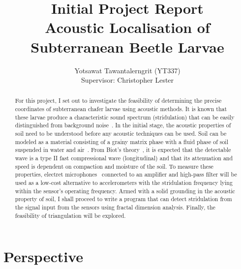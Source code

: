 \documentclass[twocolumn]{article}
\begin{document}

\title{Initial Project Report\\
    Acoustic Localisation of Subterranean Beetle Larvae}
\author{Yotsawat Tawantalerngrit (YT337)\\
    Supervisor: Christopher Lester}
\pagestyle{empty}
\maketitle
\thispagestyle{empty}

\pagestyle{fancy}

\begin{abstract}
    For this project, I set out to investigate the feasibility of determining the precise coordinates of subterranean chafer larvae using acoustic methods. It is known that these larvae produce a characteristic sound spectrum (stridulation) that can be easily distinguished from background noise~\cite{stridDetect}. In the initial stage, the acoustic properties of soil need to be understood before any acoustic techniques can be used. Soil can be modeled as a material consisting of a grainy matrix phase with a fluid phase of soil suspended in water and air~\cite{compactSoil}. From Biot's theory~\cite{biot}, it is expected that the detectable wave is a type II fast compressional wave (longitudinal) and that its attenuation and speed is dependent on compaction and moisture of the soil. To measure these properties, electret microphones~\cite{eavesdropInsect} connected to an amplifier and high-pass filter will be used as a low-cost alternative to accelerometers with the stridulation frequency lying within the sensor's operating frequency. Armed with a solid grounding in the acoustic property of soil, I shall proceed to write a program that can detect stridulation from the signal input from the sensors using fractal dimension analysis. Finally, the feasibility of triangulation will be explored.
\end{abstract}


\section{Perspective}
\end{document}
